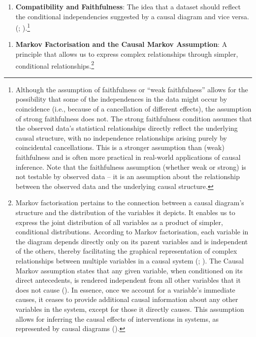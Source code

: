 \documentclass[
  singlecolumn,
  9pt]{article}
\providecommand{\tightlist}{%
  \setlength{\itemsep}{0pt}\setlength{\parskip}{0pt}}\usepackage{longtable,booktabs,array}
\begin{document}
\begin{enumerate}
\def\labelenumi{\arabic{enumi}.}
\setcounter{enumi}{8}
\tightlist
\item
  \textbf{Compatibility and Faithfulness}: The idea that a dataset
  should reflect the conditional independencies suggested by a causal
  diagram and vice versa.(;
  ).\footnote{Although
    the assumption of faithfulness or ``weak faithfulness'' allows for
    the possibility that some of the independences in the data might
    occur by coincidence (i.e., because of a cancellation of different
    effects), the assumption of strong faithfulness does not. The strong
    faithfulness condition assumes that the observed data's statistical
    relationships directly reflect the underlying causal structure, with
    no independence relationships arising purely by coincidental
    cancellations. This is a stronger assumption than (weak)
    faithfulness and is often more practical in real-world applications
    of causal inference. Note that the faithfulness assumption (whether
    weak or strong) is not testable by observed data -- it is an
    assumption about the relationship between the observed data and the
    underlying causal structure.}
\end{enumerate}

\begin{enumerate}
\def\labelenumi{\arabic{enumi}.}
\setcounter{enumi}{9}
\tightlist
\item
  \textbf{Markov Factorisation and the Causal Markov Assumption}: A
  principle that allows us to express complex relationships through
  simpler, conditional relationships.\footnote{Markov factorisation
    pertains to the connection between a causal diagram's structure and
    the distribution of the variables it depicts. It enables us to
    express the joint distribution of all variables as a product of
    simpler, conditional distributions. According to Markov
    factorisation, each variable in the diagram depends directly only on
    its parent variables and is independent of the others, thereby
    facilitating the graphical representation of complex relationships
    between multiple variables in a causal system
    (;
    ). The Causal Markov assumption
    states that any given variable, when conditioned on its direct
    antecedents, is rendered independent from all other variables that
    it does not cause (). In essence, once we account for a variable's immediate
    causes, it ceases to provide additional causal information about any
    other variables in the system, except for those it directly causes.
    This assumption allows for inferring the causal effects of
    interventions in systems, as represented by causal diagrams
    ().}
\end{enumerate}
\end{document}

